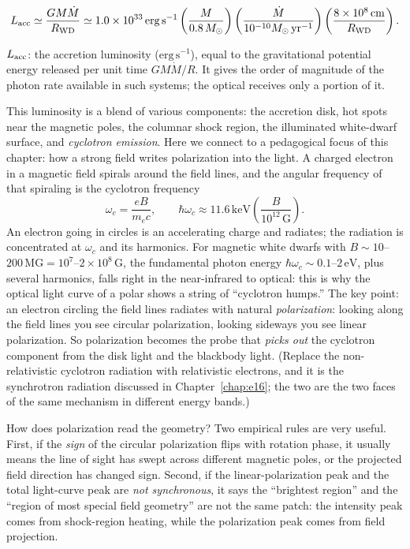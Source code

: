 \begin{equation}
  L_{\rm acc}\simeq \frac{GM\dot M}{R_{\rm WD}}
  \simeq 1.0\times10^{33}\,\mathrm{erg\,s^{-1}}
  \left(\frac{M}{0.8\,M_\odot}\right)
  \left(\frac{\dot M}{10^{-10}M_\odot\,\mathrm{yr^{-1}}}\right)
  \left(\frac{8\times10^8\,\mathrm{cm}}{R_{\rm WD}}\right).
  \label{eq:e18-lacc}
\end{equation}
\begin{formulaexplain}
\(L_{\rm acc}\): the accretion luminosity (\(\mathrm{erg\,s^{-1}}\)), equal to the gravitational potential energy released per unit time \(GM\dot M/R\). It gives the order of magnitude of the photon rate available in such systems; the optical receives only a portion of it.
\end{formulaexplain}

This luminosity is a blend of various components: the accretion disk, hot spots near the magnetic poles, the columnar shock region, the illuminated white-dwarf surface, and \emph{cyclotron emission}. Here we connect to a pedagogical focus of this chapter: how a strong field writes polarization into the light. A charged electron in a magnetic field spirals around the field lines, and the angular frequency of that spiraling is the cyclotron frequency
\[
  \omega_c=\frac{eB}{m_e c},
  \qquad
  \hbar\omega_c\approx 11.6\,\mathrm{keV}\left(\frac{B}{10^{12}\,\mathrm{G}}\right).
\]
An electron going in circles is an accelerating charge and radiates; the radiation is concentrated at \(\omega_c\) and its harmonics. For magnetic white dwarfs with \(B\sim10\)--\(200\,\mathrm{MG}=10^7\)--\(2\times10^8\,\mathrm{G}\), the fundamental photon energy \(\hbar\omega_c\sim0.1\)--\(2\,\mathrm{eV}\), plus several harmonics, falls right in the near-infrared to optical: this is why the optical light curve of a polar shows a string of ``cyclotron humps.'' The key point: an electron circling the field lines radiates with natural \emph{polarization}: looking along the field lines you see circular polarization, looking sideways you see linear polarization. So polarization becomes the probe that \emph{picks out} the cyclotron component from the disk light and the blackbody light. (Replace the non-relativistic cyclotron radiation with relativistic electrons, and it is the synchrotron radiation discussed in Chapter~\ref{chap:e16}; the two are the two faces of the same mechanism in different energy bands.)

How does polarization read the geometry? Two empirical rules are very useful. First, if the \emph{sign} of the circular polarization flips with rotation phase, it usually means the line of sight has swept across different magnetic poles, or the projected field direction has changed sign. Second, if the linear-polarization peak and the total light-curve peak are \emph{not synchronous}, it says the ``brightest region'' and the ``region of most special field geometry'' are not the same patch: the intensity peak comes from shock-region heating, while the polarization peak comes from field projection.


